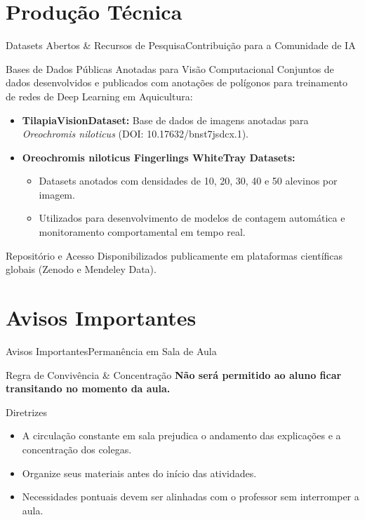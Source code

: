 \documentclass[9pt]{beamer}
\begin{document}
\section{Produção Técnica}
\begin{frame}{Datasets Abertos \& Recursos de Pesquisa}{Contribuição para a Comunidade de IA}
  \begin{block}{Bases de Dados Públicas Anotadas para Visão Computacional}
    Conjuntos de dados desenvolvidos e publicados com anotações de polígonos para treinamento de redes de Deep Learning em Aquicultura:
    \begin{itemize}
      \item \textbf{TilapiaVisionDataset:} Base de dados de imagens anotadas para \textit{Oreochromis niloticus} (DOI: 10.17632/bnst7jsdcx.1).
      \item \textbf{Oreochromis niloticus Fingerlings WhiteTray Datasets:}
        \begin{itemize}
          \item Datasets anotados com densidades de 10, 20, 30, 40 e 50 alevinos por imagem.
          \item Utilizados para desenvolvimento de modelos de contagem automática e monitoramento comportamental em tempo real.
        \end{itemize}
    \end{itemize}
  \end{block}

  \begin{exampleblock}{Repositório e Acesso}
    Disponibilizados publicamente em plataformas científicas globais (Zenodo e Mendeley Data).
  \end{exampleblock}
\end{frame}

\section{Avisos Importantes}

\begin{frame}{Avisos Importantes}{Permanência em Sala de Aula}
  \begin{alertblock}{Regra de Convivência \& Concentração}
    \textbf{Não será permitido ao aluno ficar transitando no momento da aula.}
  \end{alertblock}

  \begin{block}{Diretrizes}
    \begin{itemize}
      \item A circulação constante em sala prejudica o andamento das explicações e a concentração dos colegas.
      \item Organize seus materiais antes do início das atividades.
      \item Necessidades pontuais devem ser alinhadas com o professor sem interromper a aula.
    \end{itemize}
  \end{block}
\end{frame}
\end{document}
